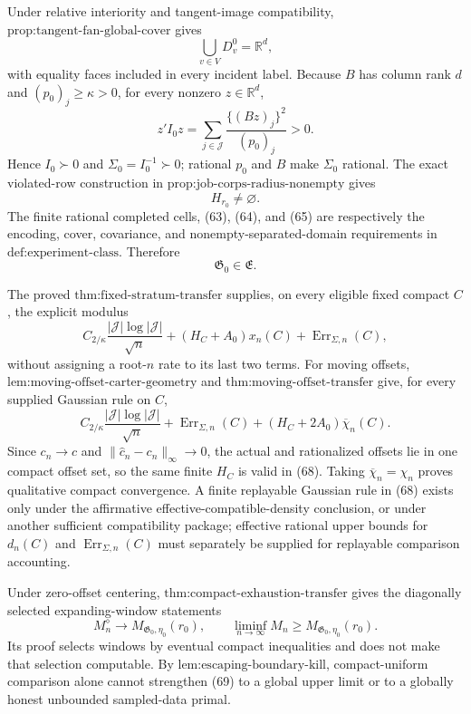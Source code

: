 Under relative interiority and tangent-image compatibility, \(\text{prop:tangent-fan-global-cover}\) gives
\[
 \bigcup_{v\in V}D_v^0=\mathbb R^d,
 \tag{63}
\]
with equality faces included in every incident label.  Because \(B\) has column rank \(d\) and \((p_0)_j\ge\kappa>0\), for every nonzero \(z\in\mathbb R^d\),
\[
 z'I_0z=\sum_{j\in\mathcal J}
 \frac{\{(Bz)_j\}^2}{(p_0)_j}>0.
 \tag{64}
\]
Hence \(I_0\succ0\) and \(\Sigma_0=I_0^{-1}\succ0\); rational \(p_0\) and \(B\) make \(\Sigma_0\) rational.  The exact violated-row construction in \(\text{prop:job-corps-radius-nonempty}\) gives
\[
 H_{r_0}\ne\varnothing.
 \tag{65}
\]
The finite rational completed cells, (63), (64), and (65) are respectively the encoding, cover, covariance, and nonempty-separated-domain requirements in \(\text{def:experiment-class}\).  Therefore
\[
 \mathfrak G_0\in\mathfrak E.
 \tag{66}
\]

The proved \(\text{thm:fixed-stratum-transfer}\) supplies, on every eligible fixed compact \(C\), the explicit modulus
\[
 C_{2/\kappa}\frac{|\mathcal J|\log|\mathcal J|}{\sqrt n}
 +(H_C+A_0)x_n(C)+\operatorname{Err}_{\Sigma,n}(C),
 \tag{67}
\]
without assigning a root-\(n\) rate to its last two terms.  For moving offsets, \(\text{lem:moving-offset-carter-geometry}\) and \(\text{thm:moving-offset-transfer}\) give, for every supplied Gaussian rule on \(C\),
\[
 C_{2/\kappa}\frac{|\mathcal J|\log|\mathcal J|}{\sqrt n}
 +\operatorname{Err}_{\Sigma,n}(C)
 +(H_C+2A_0)\overline\chi_n(C).
 \tag{68}
\]
Since \(c_n\to c\) and \(\|\widehat c_n-c_n\|_\infty\to0\), the actual and rationalized offsets lie in one compact offset set, so the same finite \(H_C\) is valid in (68).  Taking \(\overline\chi_n=\chi_n\) proves qualitative compact convergence.  A finite replayable Gaussian rule in (68) exists only under the affirmative effective-compatible-density conclusion, or under another sufficient compatibility package; effective rational upper bounds for \(d_n(C)\) and \(\operatorname{Err}_{\Sigma,n}(C)\) must separately be supplied for replayable comparison accounting.

Under zero-offset centering, \(\text{thm:compact-exhaustion-transfer}\) gives the diagonally selected expanding-window statements
\[
 M_n^{\diamond}\longrightarrow M_{\mathfrak G_0,\eta_0}(r_0),
 \qquad
 \liminf_{n\to\infty}M_n
 \ge M_{\mathfrak G_0,\eta_0}(r_0).
 \tag{69}
\]
Its proof selects windows by eventual compact inequalities and does not make that selection computable.  By \(\text{lem:escaping-boundary-kill}\), compact-uniform comparison alone cannot strengthen (69) to a global upper limit or to a globally honest unbounded sampled-data primal.


